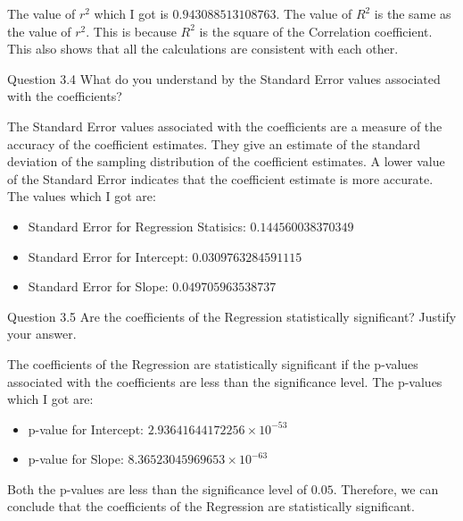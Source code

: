 The value of $r^2$ which I got is {$0.943088513108763$}. The value of $R^2$ is the same as the value of $r^2$. This is because $R^2$ is the square of the Correlation coefficient. This also shows that all the calculations are consistent with each other.

\vspace{10mm}

\begin{custombox}[label={box:Q3.4}]{Question 3.4}
	What do you understand by the Standard Error values associated with the coefficients?
\end{custombox}

The Standard Error values associated with the coefficients are a measure of the accuracy of the coefficient estimates. They give an estimate of the standard deviation of the sampling distribution of the coefficient estimates. A lower value of the Standard Error indicates that the coefficient estimate is more accurate. \\

The values which I got are:

\begin{itemize}
	\item Standard Error for Regression Statisics: $0.144560038370349$
	\item Standard Error for Intercept: $0.0309763284591115$
	\item Standard Error for Slope: $0.049705963538737$
\end{itemize}

\vspace{10mm}

\begin{custombox}[label={box:Q3.5}]{Question 3.5}
	Are the coefficients of the Regression statistically significant? Justify your answer.
\end{custombox}

The coefficients of the Regression are statistically significant if the p-values associated with the coefficients are less than the significance level. The p-values which I got are:

\begin{itemize}
	\item p-value for Intercept: $2.93641644172256 \times 10^{-53}$
	\item p-value for Slope: $8.36523045969653 \times 10^{-63}$
\end{itemize}

Both the p-values are less than the significance level of $0.05$. Therefore, we can conclude that the coefficients of the Regression are statistically significant.

